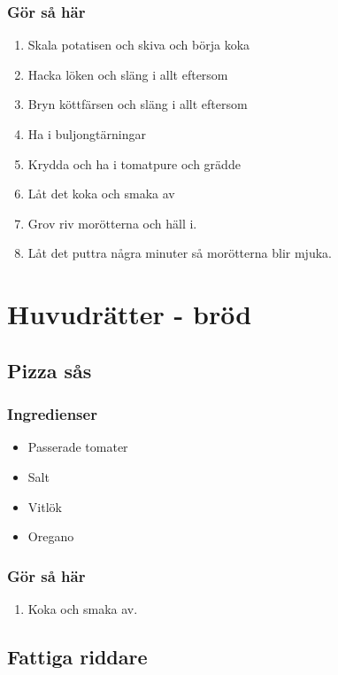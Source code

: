 \documentclass[a4paper,11pt,twocolumn]{article}
\begin{document}
\subsubsection*{Gör så här}
\begin{enumerate}[label=\arabic*.]
    \item Skala potatisen och skiva och börja koka
    \item Hacka löken och släng i allt eftersom
    \item Bryn köttfärsen och släng i allt eftersom
    \item Ha i buljongtärningar
    \item Krydda och ha i tomatpure och grädde
    \item Låt det koka och smaka av
    \item Grov riv morötterna och häll i.
    \item Låt det puttra några minuter så morötterna blir mjuka.
\end{enumerate}


\newpage
\section{Huvudrätter - bröd}

\subsection{Pizza sås}
\subsubsection*{Ingredienser}
\begin{itemize}[noitemsep]
    \item Passerade tomater
    \item Salt
    \item Vitlök
    \item Oregano
\end{itemize}
\subsubsection*{Gör så här}
\begin{enumerate}[label=\arabic*.]
    \item Koka och smaka av.
\end{enumerate}


\subsection{Fattiga riddare}
\end{document}
